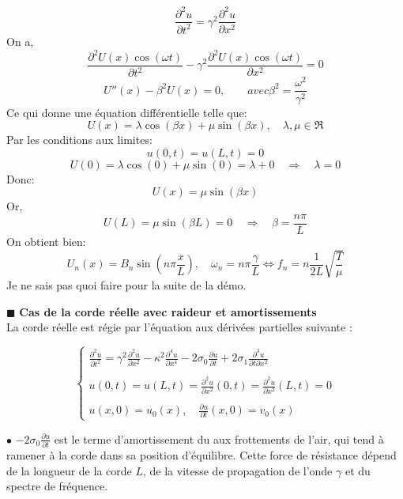 \documentclass[a4,12pt]{article}
\begin{document}

\begin{mdframed}[style=exempledefault,backgroundcolor=green!60]
\[
	\frac{\partial ^2u}{\partial t^2}=\gamma ^2\frac{\partial ^2u}{\partial x^2}
\]
On a,
\[
    \frac{\partial ^2U(x)\cos(\omega t)}{\partial t^2}-\gamma^2\frac{\partial ^2U(x)\cos(\omega t)}{\partial x^2}=0
\]
\[
    U''(x)-\beta ^2U(x)=0,\quad\quad avec \beta ^2=\frac{\omega ^2}{\gamma ^2}
\]
Ce qui donne une équation différentielle telle que:
\[
    U(x)=\lambda\cos(\beta x)+\mu\sin(\beta x),\quad \lambda,\mu \in \Re
\]
Par les conditions aux limites:
\[
    u(0,t)=u(L,t)=0
\]
\[
    U(0)=\lambda \cos(0)+\mu \sin(0)=\lambda+0 \quad \Longrightarrow \quad \lambda=0
\]
Donc: 
\[
    U(x)=\mu\sin(\beta x)
\]
Or,
\[
    U(L)=\mu\sin(\beta L)=0 \quad \Longrightarrow \quad \beta=\frac{n\pi}{L}
\]
On obtient bien:
\[
    U_n(x)=B_n\sin\left(n\pi \frac{x}{L}\right),\quad \omega_n=n\pi \frac{\gamma}{L}\Leftrightarrow f_n=n\frac{1}{2L}\sqrt{\frac{T}{\mu}}
\]
Je ne sais pas quoi faire pour la suite de la démo.
\end{mdframed}


\indent $\blacksquare$ \textbf{Cas de la corde réelle avec raideur et amortissements}\\

La corde réelle est régie par l'équation aux dérivées partielles suivante :

\begin{equation} 
\left\{
	\begin{array}{l}
		\displaystyle \frac{\partial^2 u}{\partial t^2}=\gamma^2 \frac{\partial^2 u}{\partial x^2}-\kappa^2  				\frac{\partial^4 u}{\partial x^4}-2\sigma_0  \frac{\partial u}{\partial t}+2\sigma_1  \frac{\partial^3 u}{\partial t		\partial x^2}\\ \\ 
		\displaystyle u(0,t)=u(L,t)=\frac{\partial^2 u}{\partial x^2}(0,t)=\frac{\partial^2 u}{\partial x^2}(L,t)=0\\ \\  		\displaystyle u(x,0)=u_0(x), \quad \frac{\partial u}{\partial t}(x,0)=v_0(x)
	\end{array}
\right. 
\label{eq:model_stiff}
\end{equation}

$\bullet$ $\displaystyle -2\sigma_0  \frac{\partial u}{\partial t}$ est le terme d'amortissement du aux frottements de l'air, qui tend à ramener à la corde dans sa position d'équilibre. Cette force de résistance dépend de la longueur de la corde $L$, de la vitesse de propagation de l'onde $\gamma$ et du spectre de fréquence.\\
\end{document}
